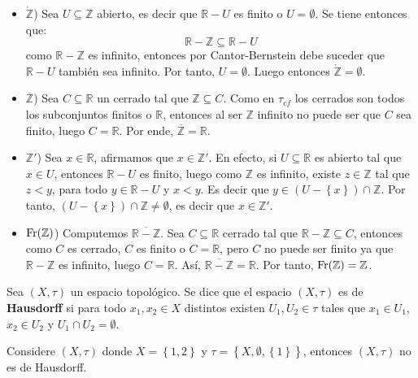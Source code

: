 \documentclass[12pt]{report}
\theoremstyle{largebreak}
\newcommand{\Int}[1]{\ensuremath{\mathring{#1}}}
\newcommand{\Cls}[1]{\ensuremath{\overline{#1}}}
\newcommand{\Fr}[1]{\ensuremath{\textup{Fr}(#1)}}
\begin{document}
\begin{sol}
\begin{enumerate}
\begin{itemize}
                \item $\Int{\mathbb{Z}}$) Sea $U\subseteq \mathbb{Z}$ abierto, es decir que $\mathbb{R}-U$ es finito o $U=\emptyset$. Se tiene entonces que:
                \begin{equation*}
                    \mathbb{R}-\mathbb{Z}\subseteq\mathbb{R}-U
                \end{equation*}
                como $\mathbb{R}-\mathbb{Z}$ es infinito, entonces por Cantor-Bernstein debe suceder que $\mathbb{R}-U$ también sea infinito. Por tanto, $U=\emptyset$. Luego entonces $\Int{\mathbb{Z}}=\emptyset$.
                \item $\Cls{\mathbb{Z}}$) Sea $C\subseteq\mathbb{R}$ un cerrado tal que $\mathbb{Z}\subseteq C$. Como en $\tau_{cf}$ los cerrados son todos los subconjuntos finitos o $\mathbb{R}$, entonces al ser $\mathbb{Z}$ infinito no puede ser que $C$ sea finito, luego $C=\mathbb{R}$. Por ende, $\Cls{\mathbb{Z}}=\mathbb{R}$.
                \item $\mathbb{Z}'$) Sea $x\in\mathbb{R}$, afirmamos que $x\in\mathbb{Z}'$. En efecto, si $U\subseteq\mathbb{R}$ es abierto tal que $x\in U$, entonces $\mathbb{R}-U$ es finito, luego como $\mathbb{Z}$ es infinito, existe $z\in\mathbb{Z}$ tal que $z< y$, para todo $y\in \mathbb{R}-U$ y $x<y$. Es decir que $y\in(U-\left\{x\right\})\cap\mathbb{Z}$. Por tanto, $(U-\left\{x\right\})\cap\mathbb{Z}\neq\emptyset$, es decir que $x\in\mathbb{Z}'$.
                \item $\Fr{\mathbb{Z}}$) Computemos $\Cls{\mathbb{R}-\mathbb{Z}}$. Sea $C\subseteq\mathbb{R}$ cerrado tal que $\mathbb{R}-\mathbb{Z}\subseteq C$, entonces como $C$ es cerrado, $C$ es finito o $C=\mathbb{R}$, pero $C$ no puede ser finito ya que $\mathbb{R}-\mathbb{Z}$ es infinito, luego $C=\mathbb{R}$. Así, $\Cls{\mathbb{R}-\mathbb{Z}}=\mathbb{R}$. Por tanto, $\Fr{\mathbb{Z}}=\mathbb{Z}$.
            \end{itemize}
        \end{enumerate}
    \end{sol}

    \begin{mydef}
        Sea $(X,\tau)$ un espacio topológico. Se dice que el espacio $(X,\tau)$ es de \textbf{Hausdorff} si para todo $x_1,x_2\in X$ distintos existen $U_1,U_2\in\tau$ tales que $x_1\in U_1$, $x_2\in U_2$ y $U_1\cap U_2=\emptyset$.
    \end{mydef}

    \begin{exa}
        Considere $(X,\tau)$ donde $X=\left\{1,2\right\}$ y $\tau=\left\{X,\emptyset, \left\{1\right\} \right\}$, entonces $(X,\tau)$ no es de Hausdorff.
    \end{exa}
\end{document}
